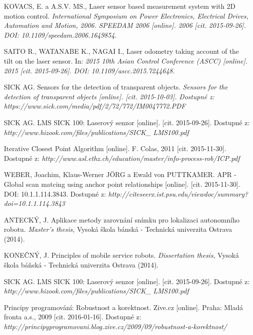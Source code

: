 \begin{thebibliography}{99}
 KOVACS, E. a A.S.V. MS.,
Laser sensor based measurement system with 2D motion control.
\textit{International Symposium on Power Electronics, Electrical Drives, Automation and Motion, 2006. SPEEDAM 2006 [online]. 2006 [cit. 2015-09-26]. DOI: 10.1109/speedam.2006.1649854.}

 SAITO R., WATANABE K., NAGAI I.,
Laser odometry taking account of the tilt on the laser sensor. In: 
\textit{2015 10th Asian Control Conference (ASCC) [online]. 2015 [cit. 2015-09-26]. DOI: 10.1109/ascc.2015.7244648.}

 SICK AG.
Sensors for the detection of transparent objects.
\textit{Sensors for the detection of transparent objects [online]. [cit. 2015-10-03]. Dostupné z: https://www.sick.com/media/pdf/2/72/772/IM0047772.PDF}

 SICK AG.
LMS SICK 100: Laserový senzor [online]. [cit. 2015-09-26]. Dostupné z: 
\textit{http://www.hizook.com/files/publications/SICK\_
\hspace{-0.8mm}LMS100.pdf}


Iterative Closest Point Algorithm [online]. F. Colas, 2011 [cit. 2015-11-30]. Dostupné z: \textit{http://www.asl.ethz.ch/education/master/info-process-rob/ICP.pdf}

WEBER, Joachim, Klaus-Werner JÖRG a Ewald von PUTTKAMER. APR - Global scan matcing using anchor point relationships [online]. [cit. 2015-11-30]. DOI: 10.1.1.114.3843. Dostupné z: \textit{http://citeseerx.ist.psu.edu/viewdoc/summary?doi=10.1.1.114.3843}


 ANTECKÝ, J.
Aplikace metody zarovnání snímku pro lokalizaci autonomního robotu.
\textit{Master’s thesis,}
Vysoká škola bánská - Technická univerzita Ostrava (2014).

 KONEČNÝ, J.
Principles of mobile service robots.
\textit{Dissertation thesis,}
Vysoká škola báňská - Technická univerzita Ostrava (2014).

 SICK AG.
LMS SICK 100: Laserový senzor [online]. [cit. 2015-09-26]. Dostupné z: 
\textit{http://www.hizook.com/files/publications/SICK\_
\hspace{-0.8mm}LMS100.pdf}

Principy programování: Robustnost a korektnost. Zive.cz [online]. Praha: Mladá fronta a.s., 2009 [cit. 2016-01-16]. Dostupné z: \textit{http://principyprogramovani.blog.zive.cz/2009/09/robustnost-a-korektnost/}


\end{thebibliography}